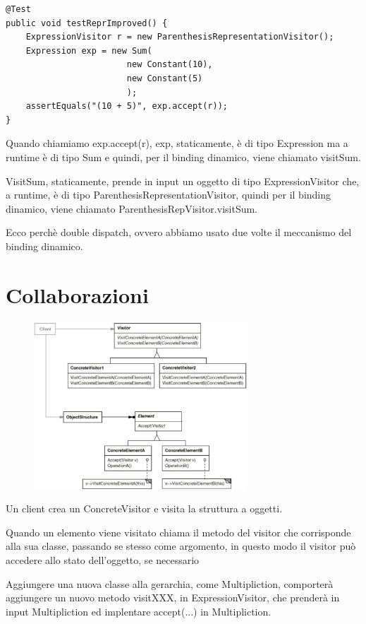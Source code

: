 \begin{lstlisting}
@Test
public void testReprImproved() {
    ExpressionVisitor r = new ParenthesisRepresentationVisitor();
    Expression exp = new Sum(
                        new Constant(10),
                        new Constant(5)
                        );
    assertEquals("(10 + 5)", exp.accept(r));
}
\end{lstlisting}

Quando chiamiamo exp.accept(r), exp, staticamente, è di tipo Expression ma a runtime è di tipo Sum e quindi, per il binding dinamico, viene chiamato visitSum.

VisitSum, staticamente, prende in input un oggetto di tipo ExpressionVisitor che, a runtime, è di tipo ParenthesisRepresentationVisitor, quindi per il binding dinamico, 
viene chiamato ParenthesisRepVisitor.visitSum.

Ecco perchè double dispatch, ovvero abbiamo usato due volte il meccanismo del binding dinamico.

\section{Collaborazioni}

\begin{figure}[H]
  \centering
  \includegraphics[width=8cm]{../../immagini/visitor/struttura_visitor}
\end{figure}

Un client crea un ConcreteVisitor e visita la struttura a oggetti.

Quando un elemento viene visitato chiama il metodo del visitor che corrisponde alla sua classe, passando se stesso come argomento, in questo modo il visitor può 
accedere allo stato dell’oggetto, se necessario

Aggiungere una nuova classe alla gerarchia, come Multipliction, comporterà aggiungere un nuovo metodo visitXXX, in ExpressionVisitor, che prenderà in input 
Multipliction ed implentare accept(...) in Multipliction.

